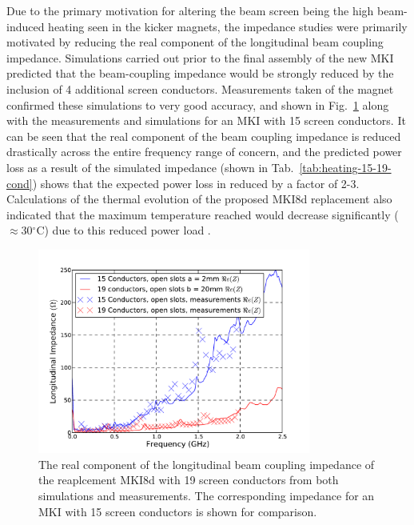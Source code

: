 Due to the primary motivation for altering the beam screen being the high beam-induced heating seen in the kicker magnets, the impedance studies were primarily motivated by reducing the real component of the longitudinal beam coupling impedance. Simulations carried out prior to the final assembly of the new MKI predicted that the beam-coupling impedance would be strongly reduced by the inclusion of 4 additional screen conductors. Measurements taken of the magnet  confirmed these simulations to very good accuracy, and shown in Fig.~\ref{fig:mki-19-impedance} along with the measurements and simulations for an MKI with 15 screen conductors. It can be seen that the real component of the beam coupling impedance is reduced drastically across the entire frequency range of concern, and the predicted power loss as a result of the simulated impedance (shown in Tab.~\ref{tab:heating-15-19-cond}) shows that the expected power loss in reduced by a factor of 2-3. Calculations of the thermal evolution of the proposed MKI8d replacement also indicated that the maximum temperature reached would decrease significantly ($\approx$30$^{\circ}$C) due to this reduced power load \cite{Garlasche:2dHeatEmis}. 

\begin{figure}
\begin{center}
\includegraphics[width=0.8\textwidth]{LHC_MKI/figures/15_19_sims_measured_comparison.pdf}
\end{center}
\caption{The real component of the longitudinal beam coupling impedance of the reaplcement MKI8d with 19 screen conductors from both simulations and measurements. The corresponding impedance for an MKI with 15 screen conductors is shown for comparison.}
\label{fig:mki-19-impedance}
\end{figure}

